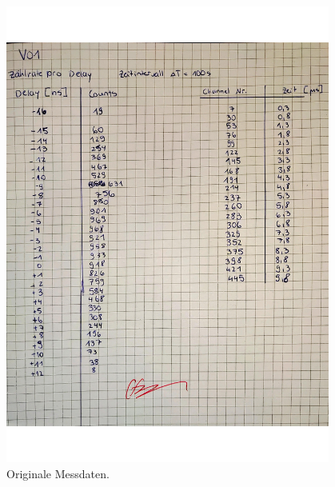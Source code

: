 \begin{figure}[H]
  \centering
  \includegraphics[width=0.95\textwidth]{../data/v01_messdaten.pdf}
  \caption{Originale Messdaten.}
  \label{fig:data}
\end{figure}